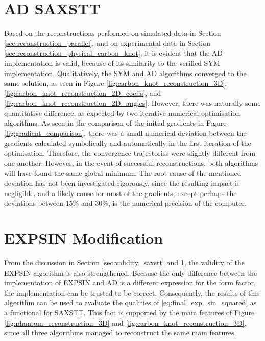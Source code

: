\section{AD SAXSTT}\label{sec:ad_validation}
Based on the reconstructions performed on simulated data in Section \ref{sec:reconstruction_parallel},
and on experimental data in Section \ref{sec:reconstruction_physical_carbon_knot},
it is evident that the AD implementation is valid, because of its similarity to the verified SYM implementation.
Qualitatively, the SYM and AD algorithms converged to the same solution, as seen in Figure \ref{fig:carbon_knot_reconstruction_3D}, \ref{fig:carbon_knot_reconstruction_2D_coeffs}, and \ref{fig:carbon_knot_reconstruction_2D_angles}.
However, there was naturally some quantitative difference, as expected by two iterative numerical optimisation algorithms.
As seen in the comparison of the initial gradients in Figure \ref{fig:gradient_comparison},
there was a small numerical deviation between the gradients calculated symbolically and automatically in the first iteration of the optimisation.
Therefore, the convergence trajectories were slightly different from one another. However, in the event of successful reconstructions,
both algorithms will have found the same global minimum.
The root cause of the mentioned deviation has not been investigated rigorously, since the resulting impact is negligible,
and a likely cause for most of the gradients, except perhaps the deviations between $15\%$ and $30\%$, is the numerical precision of the computer.


\section{EXPSIN Modification}\label{sec:saxstt_validation}
From the discussion in Section \ref{sec:validity_saxstt} and \ref{sec:ad_validation}, the validity of the EXPSIN algorithm is also strengthened.
Because the only difference between the implementation of EXPSIN and AD is a different expression for the form factor, the implementation can be trusted to be correct.
Consequently, the results of this algorithm can be used to evaluate the qualities of \eqref{eq:final_exp_sin_squared} as a functional for SAXSTT.
This fact is supported by the main features of Figure \ref{fig:phantom_reconstruction_3D} and \ref{fig:carbon_knot_reconstruction_3D},
since all three algorithms managed to reconstruct the same main features.


